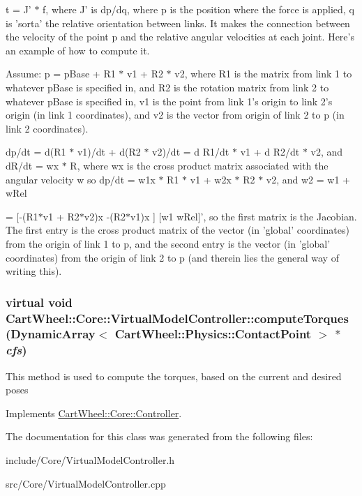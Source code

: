 t = J' $\ast$ f, where J' is dp/dq, where p is the position where the force is applied, q is 'sorta' the relative orientation between links. It makes the connection between the velocity of the point p and the relative angular velocities at each joint. Here's an example of how to compute it.

Assume: p = pBase + R1 $\ast$ v1 + R2 $\ast$ v2, where R1 is the matrix from link 1 to whatever pBase is specified in, and R2 is the rotation matrix from link 2 to whatever pBase is specified in, v1 is the point from link 1's origin to link 2's origin (in link 1 coordinates), and v2 is the vector from origin of link 2 to p (in link 2 coordinates).

dp/dt = d(R1 $\ast$ v1)/dt + d(R2 $\ast$ v2)/dt = d R1/dt $\ast$ v1 + d R2/dt $\ast$ v2, and dR/dt = wx $\ast$ R, where wx is the cross product matrix associated with the angular velocity w so dp/dt = w1x $\ast$ R1 $\ast$ v1 + w2x $\ast$ R2 $\ast$ v2, and w2 = w1 + wRel

= \mbox{[}-\/(R1$\ast$v1 + R2$\ast$v2)x -\/(R2$\ast$v1)x \mbox{]} \mbox{[}w1 wRel\mbox{]}', so the first matrix is the Jacobian. The first entry is the cross product matrix of the vector (in 'global' coordinates) from the origin of link 1 to p, and the second entry is the vector (in 'global' coordinates) from the origin of link 2 to p (and therein lies the general way of writing this). \hypertarget{classCartWheel_1_1Core_1_1VirtualModelController_ae4cf418528c2c3df886a552cb4eb14b2}{
\subsubsection[{computeTorques}]{\setlength{\rightskip}{0pt plus 5cm}virtual void CartWheel::Core::VirtualModelController::computeTorques (DynamicArray$<$ {\bf CartWheel::Physics::ContactPoint} $>$ $\ast$ {\em cfs})}}
\label{classCartWheel_1_1Core_1_1VirtualModelController_ae4cf418528c2c3df886a552cb4eb14b2}
This method is used to compute the torques, based on the current and desired poses 

Implements \hyperlink{classCartWheel_1_1Core_1_1Controller_a4355027883ca8a1be4048d95577b8e74}{CartWheel::Core::Controller}.



The documentation for this class was generated from the following files:\begin{DoxyCompactItemize}
\item 
include/Core/VirtualModelController.h\item 
src/Core/VirtualModelController.cpp\end{DoxyCompactItemize}
